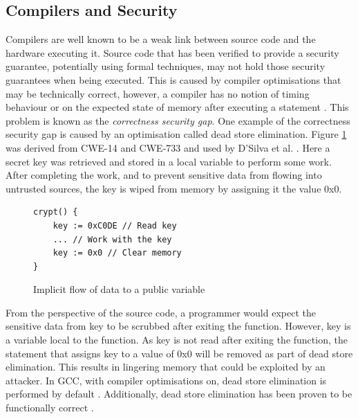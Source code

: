 \documentclass[twocolumn]{article}
\begin{document}
\subsection{Compilers and Security}
Compilers are well known to be a weak link between source code and the hardware executing it. Source code that has been verified to provide a security guarantee, potentially using formal techniques, may not hold those security guarantees when being executed. This is caused by compiler optimisations that may be technically correct, however, a compiler has no notion of timing behaviour or on the expected state of memory after executing a statement \cite{d2015correctness}. This problem is known as the \textit{correctness security gap}. One example of the correctness security gap is caused by an optimisation called dead store elimination. Figure \ref{fig:deadstore} was derived from CWE-14 \cite{cwe14} and CWE-733 \cite{cwe733} and used by D'Silva et al. \cite{d2015correctness}. Here a secret key was retrieved and stored in a local variable to perform some work. After completing the work, and to prevent sensitive data from flowing into untrusted sources, the key is wiped from memory by assigning it the value 0x0.

\begin{figure}
    \begin{lstlisting}
crypt() {
    key := 0xC0DE // Read key
    ... // Work with the key
    key := 0x0 // Clear memory
}
        \end{lstlisting}
    \caption{Implicit flow of data to a public variable \cite{d2015correctness}}
    \label{fig:deadstore}
\end{figure}

From the perspective of the source code, a programmer would expect the sensitive data from key to be scrubbed after exiting the function. However, key is a variable local to the function. As key is not read after exiting the function, the statement that assigns key to a value of 0x0 will be removed as part of dead store elimination. This results in lingering memory that could be exploited by an attacker. In GCC, with compiler optimisations on, dead store elimination is performed by default \cite{gccoptimise}. Additionally, dead store elimination has been proven to be functionally correct \cite{benton2004simple}\cite{leroy2006formal}.

\end{document}

